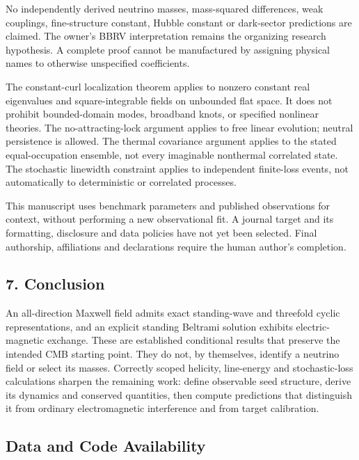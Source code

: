 \documentclass[
  11pt,
]{article}
\begin{document}
No independently derived neutrino masses, mass-squared differences, weak
couplings, fine-structure constant, Hubble constant or dark-sector
predictions are claimed. The owner's BBRV interpretation remains the
organizing research hypothesis. A complete proof cannot be manufactured
by assigning physical names to otherwise unspecified coefficients.

The constant-curl localization theorem applies to nonzero constant real
eigenvalues and square-integrable fields on unbounded flat space. It
does not prohibit bounded-domain modes, broadband knots, or specified
nonlinear theories. The no-attracting-lock argument applies to free
linear evolution; neutral persistence is allowed. The thermal covariance
argument applies to the stated equal-occupation ensemble, not every
imaginable nonthermal correlated state. The stochastic linewidth
constraint applies to independent finite-loss events, not automatically
to deterministic or correlated processes.

This manuscript uses benchmark parameters and published observations for
context, without performing a new observational fit. A journal target
and its formatting, disclosure and data policies have not yet been
selected. Final authorship, affiliations and declarations require the
human author's completion.

\hypertarget{conclusion}{%
\subsection{7. Conclusion}\label{conclusion}}

An all-direction Maxwell field admits exact standing-wave and threefold
cyclic representations, and an explicit standing Beltrami solution
exhibits electric-magnetic exchange. These are established conditional
results that preserve the intended CMB starting point. They do not, by
themselves, identify a neutrino field or select its masses. Correctly
scoped helicity, line-energy and stochastic-loss calculations sharpen
the remaining work: define observable seed structure, derive its
dynamics and conserved quantities, then compute predictions that
distinguish it from ordinary electromagnetic interference and from
target calibration.

\hypertarget{data-and-code-availability}{%
\subsection{Data and Code
Availability}\label{data-and-code-availability}}
\end{document}
